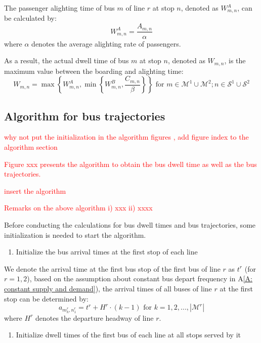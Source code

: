 \documentclass[smallextended]{svjour3}       %
\begin{document}
\begin{Abstract}
The passenger alighting time of bus $m$ of line $r$ at stop $n$, denoted as $W_{m,n}^{A}$, can be calculated by:
\begin{equation}
    \label{equ:WA}
    W_{m,n}^{A} = \frac{A_{m,n}}{\alpha} %
\end{equation}
where $\alpha$ denotes the average alighting rate of passengers. 

As a result, the actual dwell time of bus $m$ at stop $n$, denoted as $W_{m,n}$,
is the maximum value between the boarding and alighting time:
\begin{equation}
    \label{equ:W}
    W_{m,n} = \max \left\{W_{m,n}^{A},\min \left\{W_{m,n}^{B},\frac{C_{m,n}}{\beta}\right\}\right\}
    \text{ for } m \in \mathcal{M}^{1}\cup \mathcal{M}^{2};n\in \mathcal{S}^{1}\cup\mathcal{S}^{2}
\end{equation}

\subsection{Algorithm for bus trajectories}
\textcolor{red}{why not put the initialization in the algorithm figures
, add figure index to the algorithm section}

\textcolor{red}{
Figure xxx presents the algorithm to obtain the bus dwell time as well as the bus trajectories. 

insert the algorithm 


Remarks on the above algorithm 
i) xxx
ii) xxxx

}

Before conducting the calculations for bus dwell times and bus trajectories,
some initialization is needed to start the algorithm.

\begin{enumerate}[1)]
    \item Initialize the bus arrival times at the first stop of each line
\end{enumerate}

We denote the arrival time at the first bus stop of the first bus of line $r$ as $t^{r}$ (for $r=1,2$), 
based on the assumption about constant bus depart frequency in A\ref{A: constant supply and demand}), 
the arrival times of all buses of line $r$ at the first stop can be determined by:
\begin{equation}
    a_{m^{r}_{k},n^{r}_{1}} = t^{r} + H^{r} \cdot \left(k-1\right) \text{ for } k=1,2,...,\left| \mathcal{M}^{r} \right|
\end{equation}
where $H^{r}$ denotes the departure headway of line $r$. 
\begin{enumerate}[2)]
    \item Initialize dwell times of the first bus of each line at all stops served by it
\end{enumerate}


\end{Abstract}
\end{document}
